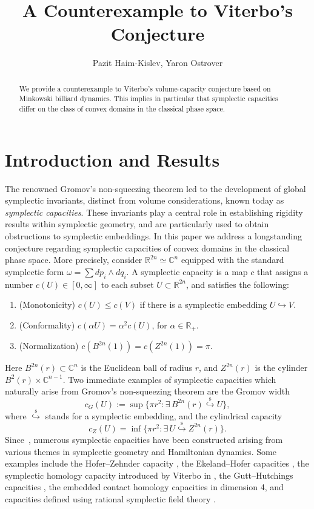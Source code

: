 \documentclass[10pt,a4paper]{article}
\theoremstyle{definition}
\newcommand{\R}{{\mathbb{R}}}
\newcommand{\C}{{\mathbb{C}}}
\begin{document}
\title{A Counterexample to Viterbo's Conjecture}
\author{Pazit Haim-Kislev, Yaron Ostrover}
\maketitle

\begin{abstract}
We provide a counterexample to Viterbo's volume-capacity conjecture based on Minkowski billiard dynamics. This implies in particular that symplectic capacities differ on the class of convex domains in the classical phase space.    
\end{abstract}


\section{Introduction and Results}


The renowned Gromov's non-squeezing theorem \cite{gromov}
led to the development of global symplectic invariants, distinct from volume considerations, known today as {\it symplectic capacities}. These invariants play a central role in establishing rigidity results within symplectic geometry, and are particularly used to obtain obstructions to symplectic embeddings.  In this paper we address a longstanding conjecture regarding  symplectic capacities of convex domains in the classical phase space. More precisely, 
consider $\R^{2n} \simeq \C^n$ equipped with the standard symplectic form $\omega = \sum dp_i \wedge dq_i$. A symplectic capacity is a map $c$ that assigns a number $c(U) \in [0,\infty]$ to each subset $U \subset \R^{2n}$, and satisfies the following:
\begin{enumerate}
\item (Monotonicity) $c(U) \leq c(V)$ if there is a symplectic embedding $U \hookrightarrow V$.
\item (Conformality) $c( \alpha U) = \alpha^2 c(U)$, for $\alpha \in \R_{+}$.
\item (Normalization) $c(B^{2n}(1)) = c(Z^{2n}(1)) = \pi$.
\end{enumerate}
Here $B^{2n}(r) \subset \C^n$ is the Euclidean ball of radius $r$, and $Z^{2n}(r)$ is the cylinder $B^2(r) \times \C^{n-1}$. 
Two immediate examples of symplectic capacities which naturally arise from Gromov's non-squeezing theorem are the Gromov width 
$$c_G(U) := \sup \{ \pi r^2 : \exists \,  B^{2n}(r) \overset{\mathrm s}{\hookrightarrow } U  \},$$
where $\overset{\mathrm s}{\hookrightarrow }$ stands for a symplectic embedding, and the cylindrical capacity
$$ c_Z(U) = \inf \{ \pi r^2 : \exists \, U  \overset{\mathrm s}{\hookrightarrow } Z^{2n}(r)  \}.$$
Since~\cite{gromov}, numerous symplectic capacities have been constructed arising from various themes in symplectic geometry and Hamiltonian dynamics. Some examples include the Hofer--Zehnder capacity \cite{hofer-zehnder}, the Ekeland--Hofer capacities \cite{hofer-ekeland}, the symplectic homology capacity introduced by Viterbo in \cite{viterbo-sh}, the Gutt--Hutchings capacities \cite{Gu-Ha}, the embedded contact homology capacities \cite{ech} in dimension 4, and capacities defined using rational symplectic field theory \cite{siegel}.
\end{document}
